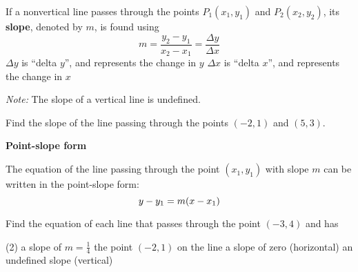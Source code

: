 \documentclass[../mathNotesPreamble]{subfiles}
\begin{document}
    \begin{defn*}
      If a nonvertical line passes through the points $P_1(x_1,y_1)$ and $P_2(x_2,y_2)$, its \textbf{slope}, denoted by $m$, is found using
        \[m=\frac{y_2-y_1}{x_2-x_1}=\frac{\Delta y}{\Delta x}\]
      $\Delta y$ is ``delta $y$'', and represents the change in $y$\newline
      $\Delta x$ is ``delta $x$'', and represents the change in $x$
    \end{defn*}
    \emph{Note:} The slope of a vertical line is undefined.
    \begin{ex*}
      Find the slope of the line passing through the points $(-2,1)$ and $(5,3)$.
    \end{ex*}
    \noindent
    \pagebreak

    \noindent\textbf{Point-slope form}
    \begin{defn*}
      The equation of the line passing through the point $(x_1,y_1)$ with slope $m$ can be written in the point-slope form:
        \[y-y_1=m{\left(x-x_1\right)}\]
    \end{defn*}
    \begin{ex*}
      Find the equation of each line that passes through the point $(-3,4)$ and has
      \begin{extasks}[after-item-skip=\stretch{1}](2)
        \task a slope of $\displaystyle m=\frac{1}{4}$
        \task the point $(-2,1)$ on the line
        \task a slope of zero (horizontal)
        \task an undefined slope (vertical)
      \end{extasks}
    \end{ex*}
    \pagebreak
\end{document}
